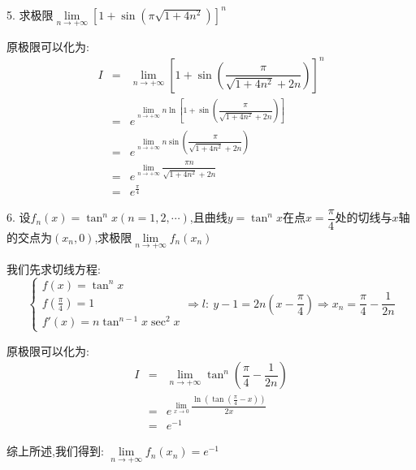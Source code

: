 5. 求极限$\lim\limits_{n\rightarrow+\infty}\left[1+\sin\left(\pi\sqrt{1+4n^2} \right) \right]^n$
\begin{solution}

	原极限可以化为:  
	\begin{eqnarray*}
		I&=&\lim\limits_{n\rightarrow+\infty}\left[1+\sin\left(\dfrac{\pi}{\sqrt{1+4n^2}+2n}\right) \right]^n\\
		&=&e^{\lim\limits_{n\rightarrow+\infty}n\ln\left[1+\sin\left(\dfrac{\pi}{\sqrt{1+4n^2}+2n}\right)\right]}\\
		&=&e^{\lim\limits_{n\rightarrow+\infty}n\sin\left(\dfrac{\pi}{\sqrt{1+4n^2}+2n}\right)}\\
		&=&e^{\lim\limits_{n\rightarrow+\infty}\dfrac{\pi n}{\sqrt{1+4n^2}+2n}}\\
		&=&e^{\frac{\pi}{4}}
	\end{eqnarray*}
\end{solution}

6. 设$f_{n}(x)=\tan^n x(n=1,2,\cdots)$,且曲线$y=\tan^n x$在点$x=\dfrac{\pi}{4}$处的切线与$x$轴的交点为$(x_{n},0)$,求极限$\lim\limits_{n\rightarrow+\infty}f_{n}(x_{n})$
\begin{solution}

	我们先求切线方程:  
	$$\left\lbrace
	\begin{array}{l}
		f(x)=\tan^n x\\
		f(\frac{\pi}{4})=1\\
		f'(x)=n\tan^{n-1}x\sec^2 x
	\end{array}
	\right. \Rightarrow l:\ y-1=2n(x-\dfrac{\pi}{4})\Rightarrow x_{n}=\dfrac{\pi}{4}-\dfrac{1}{2n}$$
	
	原极限可以化为:  
	\begin{eqnarray*}
		I&=&\lim\limits_{n\rightarrow+\infty}\tan^{n}\left( \dfrac{\pi}{4}-\dfrac{1}{2n}\right) \\
		&=&e^{\lim\limits_{x\rightarrow 0}\dfrac{\ln(\tan(\frac{\pi}{4}-x))}{2x}}\\
		&=&e^{-1}
	\end{eqnarray*}

	综上所述,我们得到:  $\lim\limits_{n\rightarrow+\infty}f_{n}(x_{n})=e^{-1}$
\end{solution}

